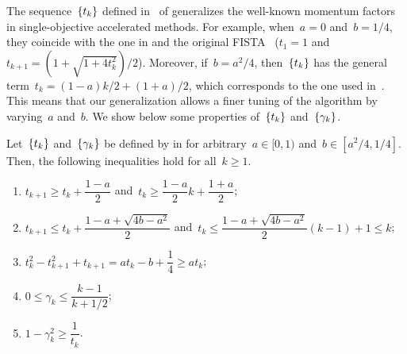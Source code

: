 \documentclass[../main]{subfiles}
\begin{document}
The sequence~$\set{t_k}$ defined in~ of  generalizes the well-known momentum factors in single-objective accelerated methods.
For example, when~$a = 0$ and~$b = 1 / 4$, they coincide with the one in  and the original FISTA~\cite{Nesterov1983,Beck2009} ($t_1 = 1$ and~$t_{k + 1} = (1 + \sqrt{1 + 4 t_k^2}) / 2$).
Moreover, if~$b = a^2 / 4$, then~$\set{t_k}$ has the general term~$t_k = (1 - a) k / 2 + (1 + a) / 2$, which corresponds to the one used in~\cite{Chambolle2015,Su2016,Attouch2016,Attouch2018}.
This means that our generalization allows a finer tuning of the algorithm by varying~$a$ and~$b$.
We show below some properties of~$\set*{t_k}$ and~$\set*{\gamma_k}$.
\begin{lemma} 
    Let~$\set{t_k}$ and~$\set*{\gamma_k}$ be defined by  in  for arbitrary~$a \in [0, 1)$ and~$b \in [a^2 / 4, 1 / 4]$.
    Then, the following inequalities hold for all~$k \ge 1$.
    \begin{enumerate}
        \item $t_{k + 1} \ge t_k + \dfrac{1 - a}{2}$ and~$t_k \ge \dfrac{1 - a}{2} k + \dfrac{1 + a}{2}$; 
        \item $t_{k + 1} \le t_k + \dfrac{1 - a + \sqrt{4b - a^2}}{2}$ and~$t_k \le \dfrac{1 - a + \sqrt{4b - a^2}}{2} (k - 1) + 1 \le k$; 
        \item $t_k^2 - t_{k + 1}^2 + t_{k + 1} = a t_k - b + \dfrac{1}{4} \ge a t_k$; 
        \item $0 \le \gamma_k \le \dfrac{k - 1}{k + 1 / 2}$; 
        \item $1 - \gamma_k^2 \ge \dfrac{1}{t_k}$. 
    \end{enumerate}
\end{lemma}
\end{document}
